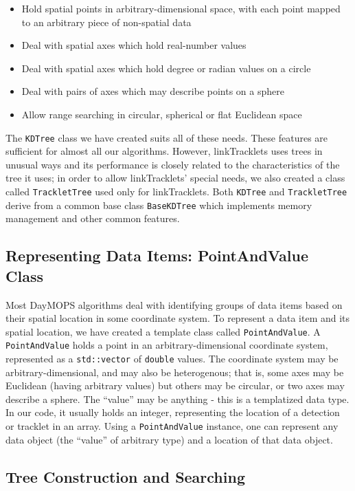 \begin{itemize}
\item Hold spatial points in arbitrary-dimensional space, with each point mapped to an arbitrary piece of non-spatial data
\item Deal with spatial axes which hold real-number values
\item Deal with spatial axes which hold degree or radian values on a circle
\item Deal with pairs of axes which may describe points on a sphere
\item Allow range searching in circular, spherical or flat Euclidean space
\end{itemize}

The {\tt KDTree} class we have created suits all of these needs.
These features are sufficient for almost all our algorithms.  However,
linkTracklets uses trees in unusual ways and its performance is
closely related to the characteristics of the tree it uses; in order
to allow linkTracklets' special needs, we also created a class called
{\tt TrackletTree} used only for linkTracklets.  Both {\tt KDTree} and
{\tt TrackletTree} derive from a common base class {\tt BaseKDTree}
which implements memory management and other common features.

\subsection{Representing Data Items: PointAndValue Class}

Most DayMOPS algorithms deal with identifying groups of data items
based on their spatial location in some coordinate system.  To
represent a data item and its spatial location, we have created a
template class called {\tt PointAndValue}.  A {\tt PointAndValue}
holds a point in an arbitrary-dimensional coordinate system,
represented as a {\tt std::vector} of {\tt double} values.  The
coordinate system may be arbitrary-dimensional, and may also be
heterogenous; that is, some axes may be Euclidean (having arbitrary
values) but others may be circular, or two axes may describe a sphere.
The ``value'' may be anything - this is a templatized data type.  In
our code, it usually holds an integer, representing the location of a
detection or tracklet in an array.  Using a {\tt PointAndValue}
instance, one can represent any data object (the ``value'' of
arbitrary type) and a location of that data object.

\subsection{Tree Construction and Searching}


